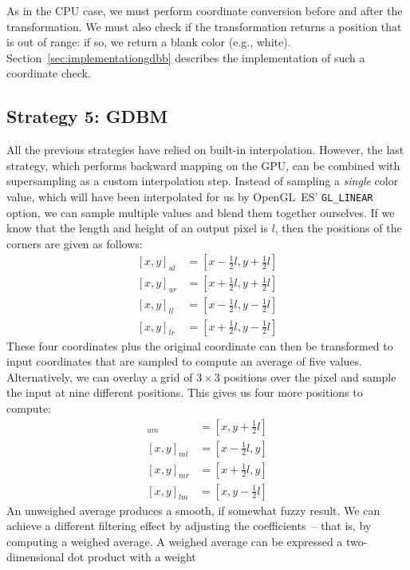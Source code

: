 \documentclass[english,12pt]{ifimaster}
\begin{document}
As in the CPU case, we must perform coordinate conversion before and
after the transformation. We must also check if the transformation
returns a position that is out of range: if so, we return a blank
color (e.g., white). Section~\ref{sec:implementationgdbb} describes
the implementation of such a coordinate check.

\subsection{Strategy 5: GDBM}
\label{sec:gdbm}

All the previous strategies have relied on built-in interpolation.
However, the last strategy, which performs backward mapping on the
GPU, can be combined with supersampling as a custom interpolation
step. Instead of sampling a \emph{single} color value, which will have
been interpolated for us by OpenGL~ES' \lstinline|GL_LINEAR| option,
we can sample multiple values and blend them together ourselves. If we
know that the length and height of an output pixel is $l$, then the
positions of the corners are given as follows:
\begin{align}
  \label{eq:ul}
  [x, y]_{ul} &= [x - \tfrac{1}{2}l, y + \tfrac{1}{2}l] \\
  [x, y]_{ur} &= [x + \tfrac{1}{2}l, y + \tfrac{1}{2}l] \\
  [x, y]_{ll} &= [x - \tfrac{1}{2}l, y - \tfrac{1}{2}l] \\
  [x, y]_{lr} &= [x + \tfrac{1}{2}l, y - \tfrac{1}{2}l]
\end{align}
These four coordinates plus the original coordinate can then be
transformed to input coordinates that are sampled to compute an
average of five values. Alternatively, we can overlay a grid of $3
\times 3$ positions over the pixel and sample the input at nine
different positions. This gives us four more positions to compute:
\begin{align}
  [x, y]_{um} &= [x, y + \tfrac{1}{2}l] \\
  [x, y]_{ml} &= [x - \tfrac{1}{2}l, y] \\
  [x, y]_{mr} &= [x + \tfrac{1}{2}l, y] \\
  \label{eq:lm}
  [x, y]_{lm} &= [x, y - \tfrac{1}{2}l]
\end{align}
An unweighed average produces a smooth, if somewhat fuzzy result. We
can achieve a different filtering effect by adjusting the
coefficients~-- that is, by computing a weighed average. A weighed
average can be expressed a two-dimensional dot product with a weight
\end{document}
